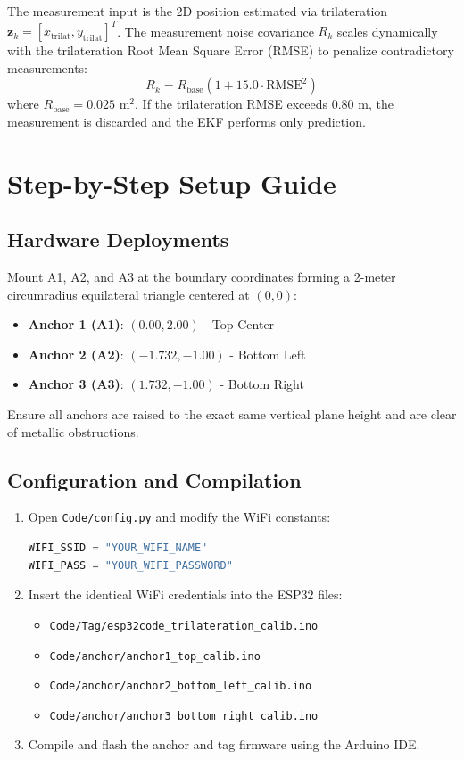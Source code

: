 \documentclass[11pt,a4paper]{article}
\begin{document}
The measurement input is the 2D position estimated via trilateration $\mathbf{z}_k = [x_{\text{trilat}}, y_{\text{trilat}}]^T$.
The measurement noise covariance $R_k$ scales dynamically with the trilateration Root Mean Square Error (RMSE) to penalize contradictory measurements:
\begin{equation}
    R_k = R_{\text{base}} \left( 1 + 15.0 \cdot \text{RMSE}^2 \right)
\end{equation}
where $R_{\text{base}} = 0.025 \text{ m}^2$. If the trilateration RMSE exceeds $0.80 \text{ m}$, the measurement is discarded and the EKF performs only prediction.

\newpage
\section{Step-by-Step Setup Guide}

\subsection{Hardware Deployments}
Mount A1, A2, and A3 at the boundary coordinates forming a 2-meter circumradius equilateral triangle centered at $(0,0)$:
\begin{itemize}
    \item \textbf{Anchor 1 (A1)}: $(0.00, 2.00)$ - Top Center
    \item \textbf{Anchor 2 (A2)}: $(-1.732, -1.00)$ - Bottom Left
    \item \textbf{Anchor 3 (A3)}: $(1.732, -1.00)$ - Bottom Right
\end{itemize}
Ensure all anchors are raised to the exact same vertical plane height and are clear of metallic obstructions.

\subsection{Configuration and Compilation}
\begin{enumerate}
    \item Open \texttt{Code/config.py} and modify the WiFi constants:
    \begin{lstlisting}[language=Python]
WIFI_SSID = "YOUR_WIFI_NAME"
WIFI_PASS = "YOUR_WIFI_PASSWORD"
    \end{lstlisting}
    \item Insert the identical WiFi credentials into the ESP32 files:
    \begin{itemize}
        \item \texttt{Code/Tag/esp32code\_trilateration\_calib.ino}
        \item \texttt{Code/anchor/anchor1\_top\_calib.ino}
        \item \texttt{Code/anchor/anchor2\_bottom\_left\_calib.ino}
        \item \texttt{Code/anchor/anchor3\_bottom\_right\_calib.ino}
    \end{itemize}
    \item Compile and flash the anchor and tag firmware using the Arduino IDE.
\end{enumerate}
\end{document}
